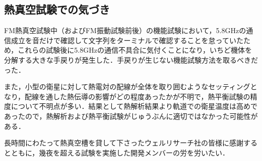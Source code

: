 \subsection{熱真空試験での気づき}
FM熱真空試験中（およびFM振動試験前後）の機能試験において，5.8GHzの通信成立を音だけで確認して文字列をターミナルで確認することを怠っていたため，これらの試験後に5.8GHzの通信不具合に気付くことになり，いちど機体を分解する大きな手戻りが発生した．手戻りが生じない機能試験方法を取るべきだった．

また，小型の衛星に対して熱電対の配線が全体を取り囲むようなセッティングとなり，配線を通した熱伝導の影響がどの程度あったかが不明で，熱平衡試験の精度について不明点が多い．結果として熱解析結果より軌道での衛星温度は高めであったので，熱解析および熱平衡試験がじゅうぶんに適切ではなかった可能性がある．

長時間にわたって熱真空槽を貸して下さったウェルリサーチ社の皆様に感謝するとともに，幾夜を超える試験を実施した開発メンバーの労を労いたい．
